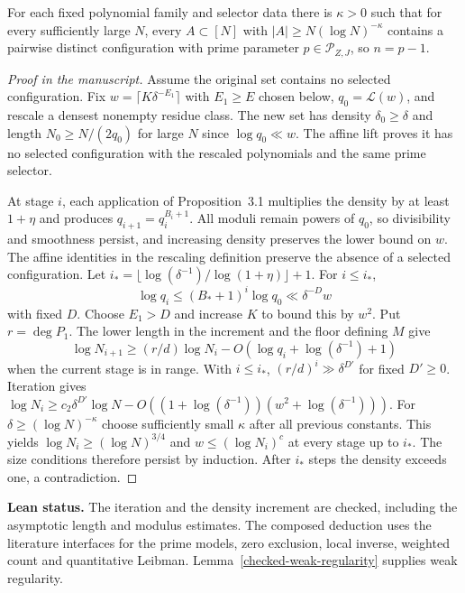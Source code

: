 \begin{theorem}\label{t:recurrence}
\leanok
{}
For each fixed polynomial family and selector data there is
$\kappa>0$ such that for every sufficiently large $N$, every
$A\subset[N]$ with $|A|\ge N(\log N)^{-\kappa}$ contains a
pairwise distinct configuration with prime parameter
$p\in\mathcal P_{Z,J}$, so $n=p-1$.
\end{theorem}
\begin{proof}[Proof in the manuscript]
\leanok
Assume the original set contains no selected configuration.
Fix $w=\lceil K\delta^{-E_1}\rceil$ with $E_1\ge E$ chosen below,
$q_0=\mathcal L(w)$, and rescale a densest nonempty residue class.
The new set has density $\delta_0\ge\delta$ and length
$N_0\ge N/(2q_0)$ for large $N$ since $\log q_0\ll w$.
The affine lift proves it has no selected configuration with the
rescaled polynomials and the same prime selector.

At stage $i$, each application of Proposition~3.1 multiplies the
density by at least $1+\eta$ and produces $q_{i+1}=q_i^{B_i+1}$.
All moduli remain powers of $q_0$, so divisibility and smoothness
persist, and increasing density preserves the lower bound on $w$.
The affine identities in the rescaling definition preserve the
absence of a selected configuration. Let
$i_*=\lfloor\log(\delta^{-1})/\log(1+\eta)\rfloor+1$.
For $i\le i_*$,
\[
 \log q_i\le (B_*+1)^i\log q_0
       \ll\delta^{-D}w
\]
with fixed $D$. Choose $E_1>D$ and increase $K$ to bound
this by $w^2$. Put $r=\deg P_1$. The lower length in the
increment and the floor defining $M$ give
\[
 \log N_{i+1}\ge(r/d)\log N_i
      -O(\log q_i+\log(\delta^{-1})+1)
\]
when the current stage is in range. With $i\le i_*$,
$(r/d)^i\gg\delta^{D'}$ for fixed $D'\ge0$. Iteration gives
$\log N_i\ge c_2\delta^{D'}\log N
-O((1+\log(\delta^{-1}))(w^2+\log(\delta^{-1})))$.
For $\delta\ge(\log N)^{-\kappa}$ choose sufficiently small
$\kappa$ after all previous constants. This yields
$\log N_i\ge(\log N)^{3/4}$ and
$w\le(\log N_i)^c$ at every stage up to $i_*$.
The size conditions therefore persist by induction.
After $i_*$ steps the density exceeds one, a contradiction.
\end{proof}
\noindent\textbf{Lean status.} The iteration and the density increment
are checked, including the asymptotic length and modulus estimates.
The composed deduction uses the literature interfaces for the prime
models, zero exclusion, local inverse, weighted count and quantitative
Leibman. Lemma~\ref{checked-weak-regularity} supplies weak regularity.

